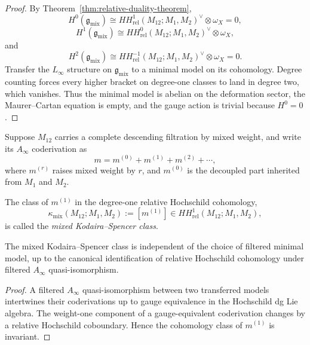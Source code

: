 \begin{proof}
By Theorem~\ref{thm:relative-duality-theorem},
\[
H^0(\mathfrak g_{\mathrm{mix}})
\cong HH^{1}_{\mathrm{rel}}(M_{12};M_1,M_2)^\vee\otimes \omega_X=0,
\]
\[
H^1(\mathfrak g_{\mathrm{mix}})
\cong HH^{0}_{\mathrm{rel}}(M_{12};M_1,M_2)^\vee\otimes \omega_X,
\]
and
\[
H^2(\mathfrak g_{\mathrm{mix}})
\cong HH^{-1}_{\mathrm{rel}}(M_{12};M_1,M_2)^\vee\otimes \omega_X=0.
\]
Transfer the $L_\infty$ structure on $\mathfrak g_{\mathrm{mix}}$ to a minimal model on its cohomology.  Degree counting forces every higher bracket on degree-one classes to land in degree two, which vanishes.  Thus the minimal model is abelian on the deformation sector, the Maurer--Cartan equation is empty, and the gauge action is trivial because $H^0=0$.
\end{proof}

\begin{definition}
\label{def:mixed-kodaira-spencer-class}
Suppose $M_{12}$ carries a complete descending filtration by mixed weight, and write its $A_\infty$ coderivation as
\[
m = m^{(0)} + m^{(1)} + m^{(2)} + \cdots,
\]
where $m^{(r)}$ raises mixed weight by $r$, and $m^{(0)}$ is the decoupled part inherited from $M_1$ and $M_2$.

The class of $m^{(1)}$ in the degree-one relative Hochschild cohomology,
\[
\kappa_{\mathrm{mix}}(M_{12};M_1,M_2)
:= [m^{(1)}]
\in HH^{1}_{\mathrm{rel}}(M_{12};M_1,M_2),
\]
is called the \emph{mixed Kodaira--Spencer class}.
\end{definition}

\begin{lemma}
\label{lem:mixed-ks-well-defined}
The mixed Kodaira--Spencer class is independent of the choice of filtered minimal model, up to the canonical identification of relative Hochschild cohomology under filtered $A_\infty$ quasi-isomorphism.
\end{lemma}

\begin{proof}
A filtered $A_\infty$ quasi-isomorphism between two transferred models intertwines their coderivations up to gauge equivalence in the Hochschild dg Lie algebra.  The weight-one component of a gauge-equivalent coderivation changes by a relative Hochschild coboundary.  Hence the cohomology class of $m^{(1)}$ is invariant.
\end{proof}

